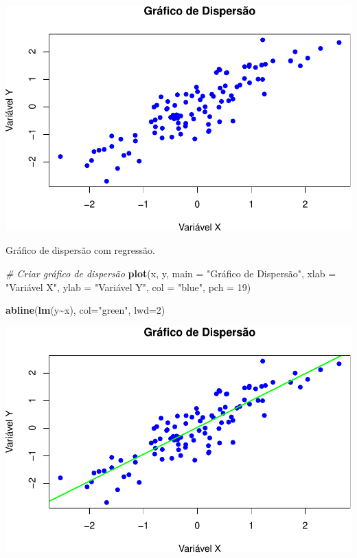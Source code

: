 \documentclass[
]{book}
\newenvironment{Shaded}{\begin{snugshade}}{\end{snugshade}}
\newcommand{\AttributeTok}[1]{\textcolor[rgb]{0.13,0.29,0.53}{#1}}
\newcommand{\CommentTok}[1]{\textcolor[rgb]{0.56,0.35,0.01}{\textit{#1}}}
\newcommand{\DecValTok}[1]{\textcolor[rgb]{0.00,0.00,0.81}{#1}}
\newcommand{\FunctionTok}[1]{\textcolor[rgb]{0.13,0.29,0.53}{\textbf{#1}}}
\newcommand{\NormalTok}[1]{#1}
\newcommand{\SpecialCharTok}[1]{\textcolor[rgb]{0.81,0.36,0.00}{\textbf{#1}}}
\newcommand{\StringTok}[1]{\textcolor[rgb]{0.31,0.60,0.02}{#1}}
\begin{document}
\includegraphics{introR_files/figure-latex/unnamed-chunk-181-1.pdf}

Gráfico de dispersão com regressão.

\begin{Shaded}
\begin{Highlighting}[]
\CommentTok{\# Criar gráfico de dispersão}
\FunctionTok{plot}\NormalTok{(x, y, }
     \AttributeTok{main =} \StringTok{"Gráfico de Dispersão"}\NormalTok{, }
     \AttributeTok{xlab =} \StringTok{"Variável X"}\NormalTok{, }
     \AttributeTok{ylab =} \StringTok{"Variável Y"}\NormalTok{, }
     \AttributeTok{col =} \StringTok{"blue"}\NormalTok{, }
     \AttributeTok{pch =} \DecValTok{19}\NormalTok{)}

\FunctionTok{abline}\NormalTok{(}\FunctionTok{lm}\NormalTok{(y}\SpecialCharTok{\textasciitilde{}}\NormalTok{x), }\AttributeTok{col=}\StringTok{"green"}\NormalTok{, }\AttributeTok{lwd=}\DecValTok{2}\NormalTok{)}
\end{Highlighting}
\end{Shaded}

\includegraphics{introR_files/figure-latex/unnamed-chunk-182-1.pdf}
\end{document}
